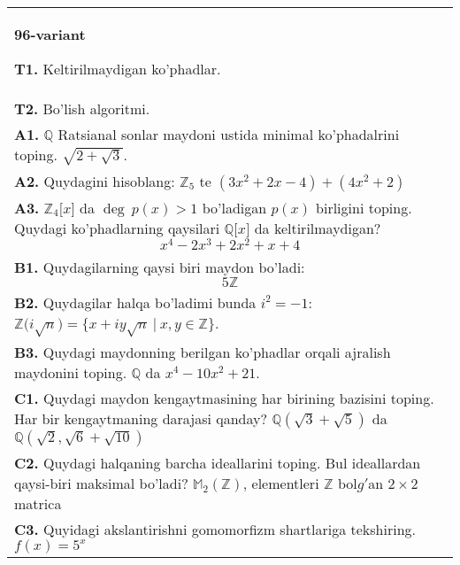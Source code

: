 \documentclass{article}
\begin{document}
\begin{tabular}{m{17cm}}
\textbf{96-variant}
\newline

\textbf{T1.} Keltirilmaydigan ko'phadlar. \\
\textbf{T2.} Bo'lish algoritmi. \\
\textbf{A1.} \(\mathbb{Q}\) Ratsianal sonlar maydoni ustida minimal ko'phadalrini toping.
\(\sqrt{2 + \sqrt{3}}\). \\
\textbf{A2.} Quydagini hisoblang:
\(\mathbb{Z}_{5}\) te \(\left( 3x^{2} + 2x - 4 \right) + \left( 4x^{2} + 2 \right)\) \\
\textbf{A3.} \(\mathbb{Z}_{4}\lbrack x\rbrack\) da \(\deg\ p(x) > 1\) bo'ladigan \(p(x)\) birligini toping. Quydagi ko'phadlarning qaysilari \(\mathbb{Q\lbrack}x\rbrack\) da keltirilmaydigan?
\[x^{4} - 2x^{3} + 2x^{2} + x + 4\] \\
\textbf{B1.} Quydagilarning qaysi biri maydon bo'ladi:
\[5\mathbb{Z}\] \\
\textbf{B2.} Quydagilar halqa bo'ladimi bunda \(i^{2} = - 1\):
\(\mathbb{Z(}i\sqrt{n}) = \{ x + iy\sqrt{n}\ |\ x,y \in \mathbb{Z\}}\). \\
\textbf{B3.} Quydagi maydonning berilgan ko'phadlar orqali ajralish maydonini toping.
\(\mathbb{Q}\) da \(x^{4} - 10x^{2} + 21\). \\
\textbf{C1.} Quydagi maydon kengaytmasining har birining bazisini toping. Har bir kengaytmaning darajasi qanday?
\(\mathbb{Q}\left( \sqrt{3} + \sqrt{5} \right)\) da \(\mathbb{Q}\left( \sqrt{2},\sqrt{6} + \sqrt{10} \right)\) \\
\textbf{C2.} Quydagi halqaning barcha ideallarini toping. Bul ideallardan qaysi-biri maksimal bo'ladi?
\(\mathbb{M}_{2}\left( \mathbb{Z} \right)\), elementleri \(\mathbb{Z}\) bol\(g'\)an \(2 \times 2\) matrica \\
\textbf{C3.} Quyidagi akslantirishni gomomorfizm shartlariga tekshiring. \(f(x) = 5^{x}\) \\

\end{tabular}
\vspace{1cm}
\end{document}
